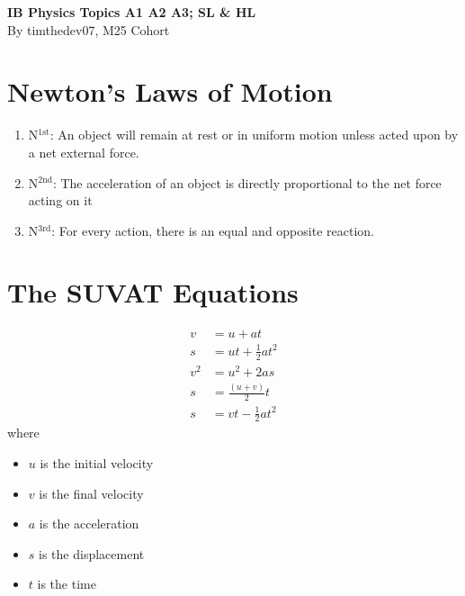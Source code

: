 \documentclass[a4paper,12pt]{article}
\let\oldsection\section
\renewcommand\section{\clearpage\oldsection}
\begin{document}
\pagestyle{fancy}


\begin{titlepage}
  \begin{center}

    \vspace*{8cm}
    \textbf{\Large {IB Physics Topics A1 A2 A3; SL \& HL}} \\
    \vspace*{1cm}
    \large{By timthedev07, M25 Cohort}

  \end{center}
\end{titlepage}

\pagebreak
\tableofcontents
\pagebreak

\clearpage
\setcounter{page}{1}

\section{Newton's Laws of Motion}

\begin{enumerate}
  \item N$^{1\text{st}}$: An object will remain at rest or in uniform motion unless acted upon by a net external force.
  \item N$^{2\text{nd}}$: The acceleration of an object is directly proportional to the net force acting on it
  \item N$^{3\text{rd}}$: For every action, there is an equal and opposite reaction.
\end{enumerate}

\section{The SUVAT Equations}

\begin{align*}
  v   & = u + at               \\
  s   & = ut + \frac{1}{2}at^2 \\
  v^2 & = u^2 + 2as            \\
  s   & = \frac{(u + v)}{2}t   \\
  s   & = vt - \frac{1}{2}at^2
\end{align*}
where
\begin{itemize}
  \item $u$ is the initial velocity
  \item $v$ is the final velocity
  \item $a$ is the acceleration
  \item $s$ is the displacement
  \item $t$ is the time
\end{itemize}
\end{document}
